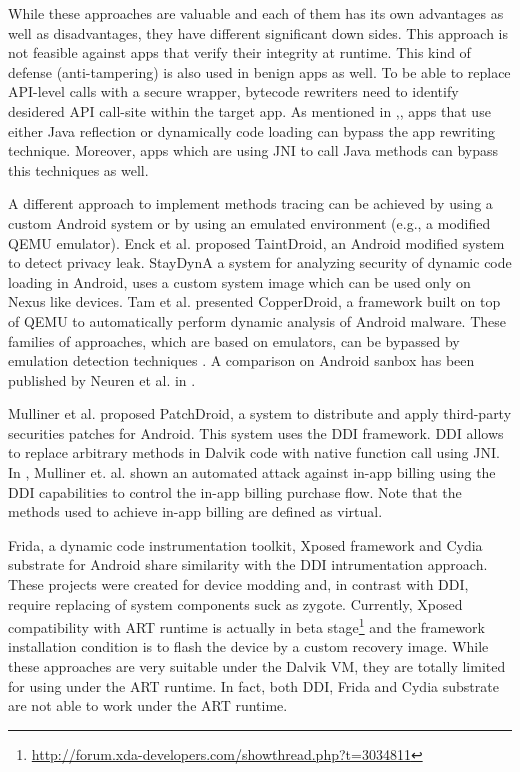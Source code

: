 While these approaches are valuable and each of them has its own advantages as well as disadvantages, they have different significant down sides. This approach is not feasible against apps that verify their integrity at runtime. This kind of defense (anti-tampering) is also used in benign apps as well. To be able to replace API-level calls with a secure wrapper, bytecode rewriters need to identify desidered API call-site within the target app. As mentioned in \cite{hao2013effectiveness},\cite{zhauniarovich2015stadyna}, apps that use either Java reflection or dynamically code loading can bypass the app rewriting technique. Moreover, apps which are using JNI to call Java methods can bypass this techniques as well.

A different approach to implement methods tracing can be achieved by using a custom Android system or by using an emulated environment (e.g., a modified QEMU emulator). Enck et al. proposed TaintDroid\cite{enck2014taintdroid}, an Android modified system to detect privacy leak. StayDynA\cite{zhauniarovich2015stadyna} a system for analyzing security of dynamic code loading in Android, uses a custom system image  which can be used only on Nexus like devices. Tam et al. presented CopperDroid\cite{tam2015copperdroid}, a framework built on top of QEMU to automatically perform dynamic analysis of Android malware. These families of approaches, which are based on emulators, can be bypassed by emulation detection techniques \cite{petsas2014rage} \cite{vidas2014evading}. A comparison on Android sanbox has been published by Neuren et al. in \cite{neuner2014enter}. 

Mulliner et al. proposed PatchDroid\cite{mulliner2013patchdroid}, a system to distribute and apply third-party securities patches for Android. This system uses the DDI\cite{DDI} framework. DDI allows to replace arbitrary methods in Dalvik code with native function call using JNI. In \cite{mulliner2014virtualswindle}, Mulliner et. al. shown an automated attack against in-app billing using the DDI capabilities to control the in-app billing purchase flow. Note that the methods used to achieve in-app billing are defined as virtual.

Frida\cite{Frida}, a dynamic code instrumentation toolkit, Xposed framework  \cite{Xposed} and Cydia substrate for Android \cite{Cydia} share similarity with the DDI intrumentation approach. These projects were created for device modding and, in contrast with DDI, require replacing of system components suck as zygote. Currently, Xposed compatibility with ART runtime is actually in beta stage\footnote{\url{http://forum.xda-developers.com/showthread.php?t=3034811}} and the framework installation condition is to flash the device by a custom recovery image.
While these approaches are very suitable under the Dalvik VM, they are totally limited for using under the ART runtime. In fact, both DDI, Frida and Cydia substrate are not able to work under the ART runtime. 

